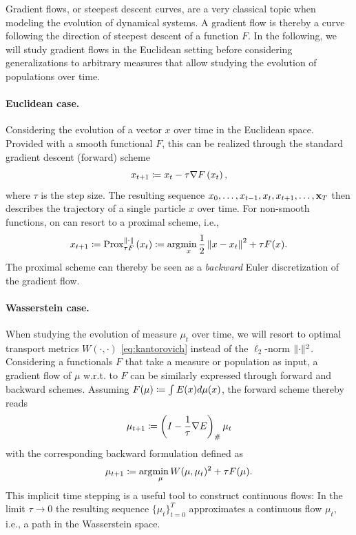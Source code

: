 Gradient flows, or steepest descent curves, are a very classical topic when modeling the evolution of dynamical systems.
A gradient flow is thereby a curve following the direction of steepest descent of a function $F$.
In the following, we will study gradient flows in the Euclidean setting before considering generalizations to arbitrary measures that allow studying the evolution of populations over time.

\paragraph{Euclidean case.} Considering the evolution of a vector $x$ over time in the Euclidean space. Provided with a smooth functional $F$, this can be realized through the standard gradient descent (forward) scheme
\begin{equation*}
	x_{t+1} \coloneqq x_{t}-\tau \nabla F\left(x_{t}\right),
\end{equation*}
where $\tau$ is the step size. The resulting sequence ${x_0, \dots, x_{t-1}, x_{t}, x_{t+1}, \dots, \mathbf{x}_T}$ then describes the trajectory of a single particle $x$ over time.
For non-smooth functions, on can resort to a proximal scheme, i.e.,
\begin{equation*}
	x_{t+1} \coloneqq \operatorname{Prox}_{\tau F}^{\|\cdot\|}\left(x_{t}\right) \coloneqq \arg\!\min_x \frac{1}{2}\left\| x-x_t\right\|^2+\tau F(x).
\end{equation*}
The proximal scheme can thereby be seen as a \emph{backward} Euler discretization of the gradient flow.

\paragraph{Wasserstein case.} When studying the evolution of measure $\mu_t$ over time, we will resort to optimal transport metrics $W(\cdot, \cdot)$ \eqref{eq:kantorovich} instead of the $\ell_2$-norm $\lVert\cdot\rVert^2$.
Considering a functionals $F$ that take a measure or population as input, a gradient flow of $\mu$ w.r.t. to $F$ can be similarly expressed through forward and backward schemes. Assuming $F(\mu) 
\coloneqq \int E(x) d \mu(x)$, the forward scheme thereby reads
\begin{equation*}
	\mu_{t+1} \coloneqq \left(I-\frac{1}{\tau} \nabla E\right)_{\#} \mu_t
\end{equation*}
with the corresponding backward formulation defined as
\begin{equation}
	\label{eq:prox_measure}
	\mu_{t+1} \coloneqq \arg\!\min_\mu W(\mu, \mu_t)^2+\tau F(\mu).
\end{equation}
This implicit time stepping is a useful tool to construct continuous flows: In the limit $\tau \rightarrow 0$ the resulting sequence $\{\mu_t\}_{t=0}^T$ approximates a continuous flow $\mu_t$, i.e., a path in the Wasserstein space.

